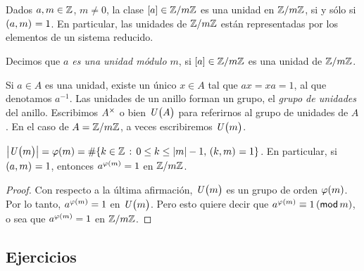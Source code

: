 \begin{coroModulares}\label{coro:modulares:unidades}
	Dados $a,m\in\Enteros$, $m\neq 0$, la clase $\clase a\in\Enterosmod[m]$
	es una unidad en $\Enterosmod[m]$, si y s\'olo si $\mcd{a,m}=1$.
	En particular, las unidades de $\Enterosmod[m]$ est\'an representadas
	por los elementos de un sistema reducido.
\end{coroModulares}

\begin{defModulares}\label{def:modulares:unidades}
	Decimos que \emph{$a$ es una unidad m\'odulo $m$}, si
	$\clase a\in\Enterosmod[m]$ es una unidad de $\Enterosmod[m]$.
\end{defModulares}

\begin{obsModulares}\label{obs:modulares:unidades}
	Si $a\in A$ es una unidad, existe un \'unico $x\in A$ tal que
	$ax=xa=1$, al que denotamos $a^{-1}$. Las unidades de un anillo
	forman un grupo, el \emph{grupo de unidades} del anillo.
	Escribimos $\Unidades A$ o bien $\Unidadesmod[A]$ para referirnos
	al grupo de unidades de $A$. En el caso de $A=\Enterosmod[m]$,
	a veces escribiremos $\Unidadesmod[m]$.
\end{obsModulares}

\begin{coroModulares}\label{coro:modulares:unidades:phi}
	\begin{math}
		\indice{\Unidadesmod[m]}=\eulerphi(m)=
			\cardinal{\{k\in\Enteros\,:\,
				0\leq k\leq |m|-1,\,\mcd{k,m}=1\}}
	\end{math}.
	En particular, si $\mcd{a,m}=1$, entonces $a^{\eulerphi(m)}=1$ en
	$\Enterosmod[m]$.
\end{coroModulares}

\begin{proof}
	Con respecto a la \'ultima afirmaci\'on, $\Unidadesmod[m]$ es un
	grupo de orden $\eulerphi(m)$. Por lo tanto, $a^{\eulerphi(m)}=1$
	en $\Unidadesmod[m]$. Pero esto quiere decir que
	$a^{\eulerphi(m)}\equiv 1\tmodulo[m]$, o sea que
	$a^{\eulerphi(m)}=1$ en $\Enterosmod[m]$.
\end{proof}

\subsection*{Ejercicios}



